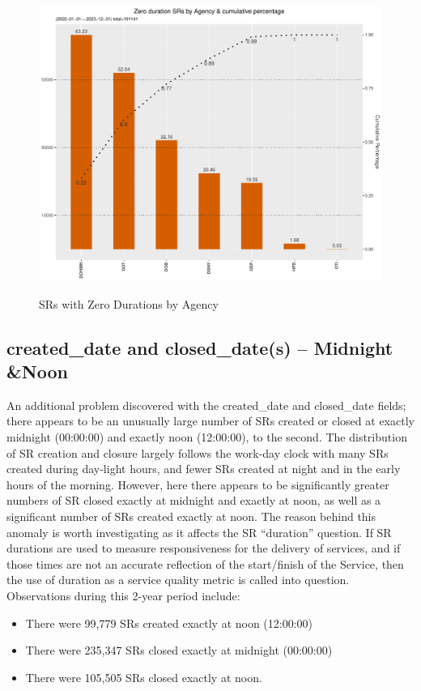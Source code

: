 \documentclass[12pt, titlepage]{article}
\begin{document}
{	\begin{figure}[tbp]
		 \centering
		  \caption{SRs with Zero Durations by Agency}
		 \includegraphics[width = \textwidth]{zero_duration_SR.pdf}
		 \label{fig:zero-duration}
	\end{figure}	
		
	\subsection{created\_date and closed\_date(s) -- Midnight \&Noon}
	An additional problem discovered with the created\_date and closed\_date fields; there appears to be an unusually large number of 
	SRs created or closed at exactly midnight (00:00:00) and exactly noon (12:00:00), to the second. The distribution of SR creation and closure 
	largely follows the work-day clock with many SRs created during day-light hours, and fewer SRs 
	created at night and in the early hours of the morning. 
	However, here there appears to be significantly greater numbers of SR closed exactly at midnight and exactly at noon,
	as well as a significant number of SRs created exactly at noon. The reason behind this anomaly is worth investigating 
	as it affects the SR ``duration'' question. If SR durations are used to measure responsiveness
	for the delivery of services, and if those times are not an accurate reflection of the start/finish of the Service, then the use of
	duration as a service quality metric is called into question. Observations during this 2-year period include:
	
	\begin{itemize}
		    \item There were 99,779 SRs created exactly at noon (12:00:00)
		    \item There were 235,347 SRs closed exactly at midnight (00:00:00)
		    \item There were 105,505 SRs closed exactly at noon. 
	\end{itemize}
	
}
\end{document}

